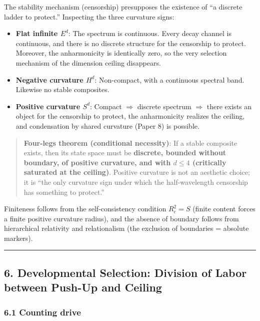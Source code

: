 \documentclass[
]{article}
\providecommand{\tightlist}{%
  \setlength{\itemsep}{0pt}\setlength{\parskip}{0pt}}
\begin{document}
The stability mechanism (censorship) presupposes the existence of ``a
discrete ladder to protect.'' Inspecting the three curvature signs:

\begin{itemize}
\tightlist
\item
  \textbf{Flat infinite \(E^d\)}: The spectrum is continuous. Every
  decay channel is continuous, and there is no discrete structure for
  the censorship to protect. Moreover, the anharmonicity is identically
  zero, so the very selection mechanism of the dimension ceiling
  disappears.
\item
  \textbf{Negative curvature \(H^d\)}: Non-compact, with a continuous
  spectral band. Likewise no stable composites.
\item
  \textbf{Positive curvature \(S^d\)}: Compact $\Longrightarrow$ discrete spectrum $\Longrightarrow$
  there exists an object for the censorship to protect, the
  anharmonicity realizes the ceiling, and condensation by shared
  curvature (Paper 8) is possible.
\end{itemize}

\begin{quote}
\textbf{Four-legs theorem (conditional necessity)}: If a stable
composite exists, then its state space must be \textbf{discrete, bounded
without boundary, of positive curvature, and with \(d\le4\) (critically
saturated at the ceiling)}. Positive curvature is not an aesthetic
choice; it is ``the only curvature sign under which the half-wavelength
censorship has something to protect.''
\end{quote}

Finiteness follows from the self-consistency condition \(R_c^2=S\)
(finite content forces a finite positive curvature radius), and the
absence of boundary follows from hierarchical relativity and
relationalism (the exclusion of boundaries = absolute markers).

\begin{center}\rule{0.5\linewidth}{0.5pt}\end{center}

\subsection{6. Developmental Selection: Division of Labor between
Push-Up and
Ceiling}\label{developmental-selection-division-of-labor-between-push-up-and-ceiling}

\subsubsection{6.1 Counting drive}\label{counting-drive}
\end{document}
